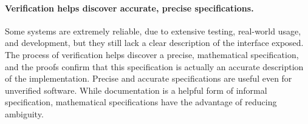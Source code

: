 %

\paragraph{Verification helps discover accurate, precise specifications.} Some
systems are extremely reliable, due to extensive testing, real-world usage, and
development, but they still lack a clear description of the interface exposed.
The process of verification helps discover a precise, mathematical
specification, and the proofs confirm that this specification is actually an
accurate description of the implementation. Precise and accurate specifications
are useful even for unverified software. While documentation is a helpful form
of informal specification, mathematical specifications have the advantage of
reducing ambiguity.

